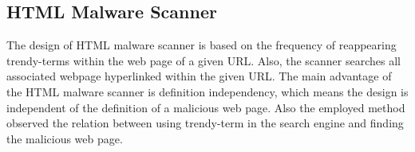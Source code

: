 \subsection{HTML Malware Scanner}

The design of HTML malware scanner is based on the frequency of reappearing trendy-terms within the web page of a given URL. Also, the scanner searches all associated webpage hyperlinked within the given URL. The main advantage of the HTML malware scanner is definition independency, which means the design is independent of the definition of a malicious web page. Also the employed method observed the relation between using trendy-term in the search engine and finding the malicious web page.

